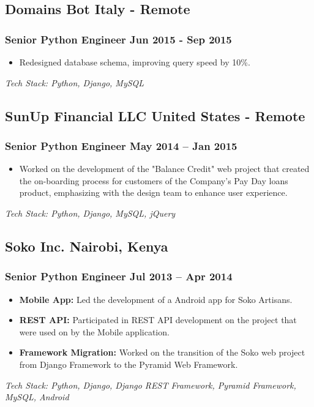 \documentclass[11pt]{article} %
\newcommand \techstack [1]
    {\small\textit{Tech Stack: {#1}}} %
\begin{document}
\subsection{Domains Bot \hfill Italy - Remote}
\subsubsection{Senior Python Engineer \hfill  Jun 2015 - Sep 2015}
\begin{itemize}
    \item Redesigned database schema, improving query speed by 10\%.
\end{itemize}
\techstack{Python, Django, MySQL}
\vspace{0.8em}

\subsection{SunUp Financial LLC \hfill United States - Remote}
\subsubsection{Senior Python Engineer \hfill  May 2014 -- Jan 2015}
\begin{itemize}
    \item Worked on the development of the "Balance Credit" web project that created the on-boarding process for customers of the Company's Pay Day loans product, emphasizing with the design team to enhance user experience.
\end{itemize}
\techstack{Python, Django, MySQL, jQuery}
\vspace{0.8em}

\subsection{Soko Inc. \hfill Nairobi, Kenya}
\subsubsection{Senior Python Engineer \hfill  Jul 2013 -- Apr 2014}
\begin{itemize}
    \item \textbf{Mobile App:} Led the development of a Android app for Soko Artisans.
    \item \textbf{REST API:} Participated in REST API development on the project that were used on by the Mobile application.
    \item \textbf{Framework Migration:} Worked on the transition of the Soko web project from Django Framework to the Pyramid Web Framework.
\end{itemize}
\techstack{Python, Django, Django REST Framework, Pyramid Framework, MySQL, Android}
\vspace{0.8em}
\end{document}
